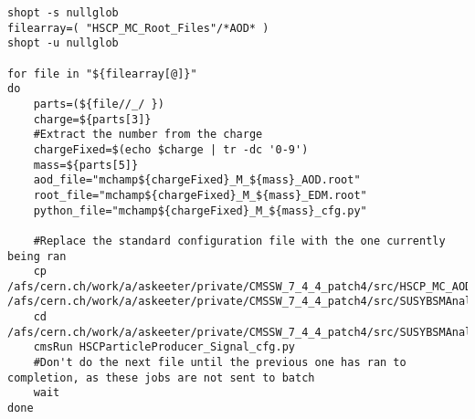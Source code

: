 \documentclass[11pt]{article}
\begin{document}
\begin{enumerate}
\begin{verbatim}
shopt -s nullglob
filearray=( "HSCP_MC_Root_Files"/*AOD* )
shopt -u nullglob

for file in "${filearray[@]}"
do
    parts=(${file//_/ })
    charge=${parts[3]}
    #Extract the number from the charge
    chargeFixed=$(echo $charge | tr -dc '0-9')
    mass=${parts[5]}    
    aod_file="mchamp${chargeFixed}_M_${mass}_AOD.root"
    root_file="mchamp${chargeFixed}_M_${mass}_EDM.root"
    python_file="mchamp${chargeFixed}_M_${mass}_cfg.py"

    #Replace the standard configuration file with the one currently being ran
    cp /afs/cern.ch/work/a/askeeter/private/CMSSW_7_4_4_patch4/src/HSCP_MC_AODtoEDM_Python_Files/${python_file} /afs/cern.ch/work/a/askeeter/private/CMSSW_7_4_4_patch4/src/SUSYBSMAnalysis/HSCP/test/MakeEDMtuples/HSCParticleProducer_Signal_cfg.py
    cd /afs/cern.ch/work/a/askeeter/private/CMSSW_7_4_4_patch4/src/SUSYBSMAnalysis/HSCP/test/MakeEDMtuples/
    cmsRun HSCParticleProducer_Signal_cfg.py
    #Don't do the next file until the previous one has ran to completion, as these jobs are not sent to batch
    wait
done
\end{verbatim}
\end{enumerate}
\end{document}
